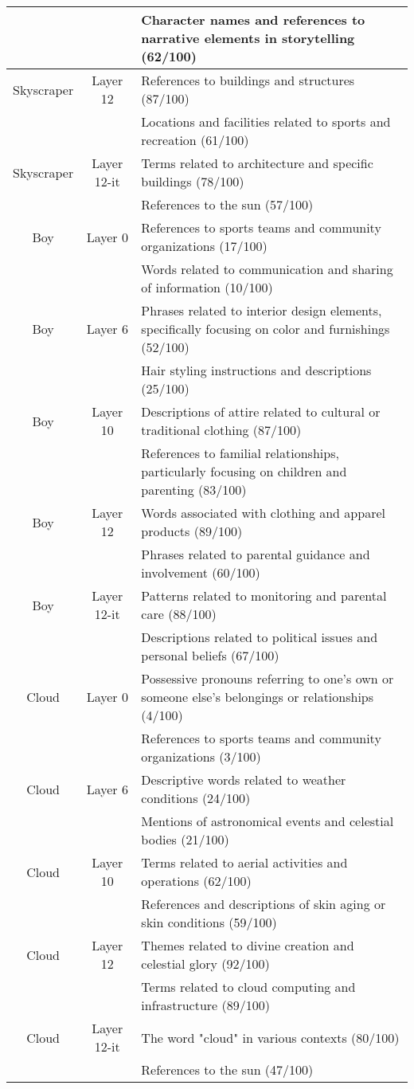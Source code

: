 \begin{longtable}{|c|c|p{7cm}|}
 &  & Character names and references to narrative elements in storytelling (62/100) \\
\hline
Skyscraper & Layer 12 & References to buildings and structures (87/100) \\
 &  & Locations and facilities related to sports and recreation (61/100) \\
\hline
Skyscraper & Layer 12-it & Terms related to architecture and specific buildings (78/100) \\
 &  & References to the sun (57/100) \\
\hline
Boy & Layer 0 & References to sports teams and community organizations (17/100) \\
 &  & Words related to communication and sharing of information (10/100) \\
\hline
Boy  & Layer 6 & Phrases related to interior design elements, specifically focusing on color and furnishings (52/100) \\
 &  & Hair styling instructions and descriptions (25/100) \\
\hline
Boy  & Layer 10 & Descriptions of attire related to cultural or traditional clothing (87/100) \\
 &  & References to familial relationships, particularly focusing on children and parenting (83/100) \\
\hline
Boy  & Layer 12 & Words associated with clothing and apparel products (89/100) \\
 &  & Phrases related to parental guidance and involvement (60/100) \\
\hline
Boy  & Layer 12-it & Patterns related to monitoring and parental care (88/100) \\
 &  & Descriptions related to political issues and personal beliefs (67/100) \\
\hline
Cloud & Layer 0 & Possessive pronouns referring to one's own or someone else's belongings or relationships (4/100) \\
 &  & References to sports teams and community organizations (3/100) \\
\hline
Cloud & Layer 6 & Descriptive words related to weather conditions (24/100) \\
 &  & Mentions of astronomical events and celestial bodies (21/100) \\
\hline
Cloud & Layer 10 & Terms related to aerial activities and operations (62/100) \\
 &  & References and descriptions of skin aging or skin conditions (59/100) \\
\hline
Cloud & Layer 12 & Themes related to divine creation and celestial glory (92/100) \\
 &  & Terms related to cloud computing and infrastructure (89/100) \\
\hline
Cloud & Layer 12-it & The word "cloud" in various contexts (80/100) \\
 &  & References to the sun (47/100) \\
\hline

\end{longtable}

